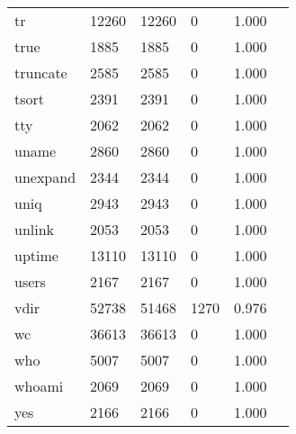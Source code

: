 \begin{longtable}{lp{2.20cm}p{2.20cm}p{2.20cm}p{2.20cm}p{2.20cm}}
tr        &                    12260 &        12260 &             0 &                    1.000 \\
true      &                     1885 &         1885 &             0 &                    1.000 \\
truncate  &                     2585 &         2585 &             0 &                    1.000 \\
tsort     &                     2391 &         2391 &             0 &                    1.000 \\
tty       &                     2062 &         2062 &             0 &                    1.000 \\
uname     &                     2860 &         2860 &             0 &                    1.000 \\
unexpand  &                     2344 &         2344 &             0 &                    1.000 \\
uniq      &                     2943 &         2943 &             0 &                    1.000 \\
unlink    &                     2053 &         2053 &             0 &                    1.000 \\
uptime    &                    13110 &        13110 &             0 &                    1.000 \\
users     &                     2167 &         2167 &             0 &                    1.000 \\
vdir      &                    52738 &        51468 &          1270 &                    0.976 \\
wc        &                    36613 &        36613 &             0 &                    1.000 \\
who       &                     5007 &         5007 &             0 &                    1.000 \\
whoami    &                     2069 &         2069 &             0 &                    1.000 \\
yes       &                     2166 &         2166 &             0 &                    1.000 \\
\end{longtable}
